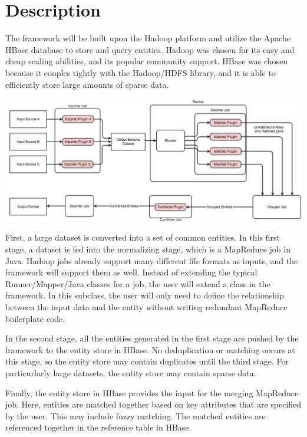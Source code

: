 \documentclass[12pt]{article}
\begin{document}
\section{Description}
The framework will be built upon the Hadoop platform and utilize the Apache HBase database to store and query entities. Hadoop was chosen for its easy and cheap scaling abilities, and its popular community support. HBase was chosen because it couples tightly with the Hadoop/HDFS library, and it is able to efficiently store large amounts of sparse data.

\includegraphics[scale=.5]{architecture}

First, a large dataset is converted into a set of common entities.
In this first stage, a dataset is fed into the normalizing stage, which is a MapReduce job in Java. Hadoop jobs already support many different file formats as inputs, and the framework will support them as well. Instead of extending the typical Runner/Mapper/Java classes for a job, the user will extend a class in the framework. In this subclass, the user will only need to define the relationship between the input data and the entity without writing redundant MapReduce boilerplate code.

In the second stage, all the entities generated in the first stage are pushed by the framework to the entity store in HBase. No deduplication or matching occurs at this stage, so the entity store may contain duplicates until the third stage. For particurlarly large datasets, the entity store may contain sparse data.

Finally, the entity store in HBase provides the input for the merging MapReduce job. Here, entities are matched together based on key attributes that are specified by the user. This may include fuzzy matching. The matched entities are referenced together in the reference table in HBase.
\end{document}
